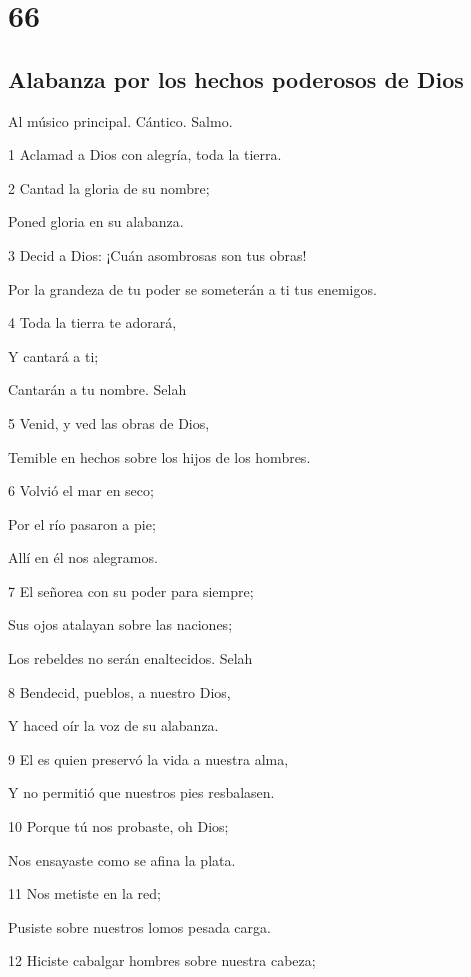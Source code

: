 \chapter{66}

\section*{Alabanza por los hechos poderosos de Dios}

\par Al músico principal. Cántico. Salmo.

\par 1 Aclamad a Dios con alegría, toda la tierra.
\par 2 Cantad la gloria de su nombre;
\par Poned gloria en su alabanza.
\par 3 Decid a Dios: ¡Cuán asombrosas son tus obras!
\par Por la grandeza de tu poder se someterán a ti tus enemigos.
\par 4 Toda la tierra te adorará,
\par Y cantará a ti;
\par Cantarán a tu nombre. Selah
\par 5 Venid, y ved las obras de Dios,
\par Temible en hechos sobre los hijos de los hombres.
\par 6 Volvió el mar en seco;
\par Por el río pasaron a pie;
\par Allí en él nos alegramos.
\par 7 El señorea con su poder para siempre;
\par Sus ojos atalayan sobre las naciones;
\par Los rebeldes no serán enaltecidos. Selah
\par 8 Bendecid, pueblos, a nuestro Dios,
\par Y haced oír la voz de su alabanza.
\par 9 El es quien preservó la vida a nuestra alma,
\par Y no permitió que nuestros pies resbalasen.
\par 10 Porque tú nos probaste, oh Dios;
\par Nos ensayaste como se afina la plata.
\par 11 Nos metiste en la red;
\par Pusiste sobre nuestros lomos pesada carga.
\par 12 Hiciste cabalgar hombres sobre nuestra cabeza;
